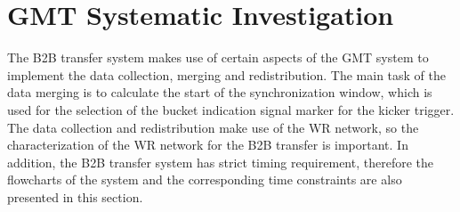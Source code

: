 \section{GMT Systematic Investigation}
\label{real_timing}
The B2B transfer system makes use of certain aspects of the GMT system to implement the data collection, merging and redistribution. The main task of the data merging is to calculate the start of the synchronization window, which is used for the selection of the bucket indication signal marker for the kicker trigger. The data collection and redistribution make use of the WR network, so the characterization of the WR network for the B2B transfer is important. In addition, the B2B transfer system has strict timing requirement, therefore the flowcharts of the system and the corresponding time constraints are also presented in this section. 

